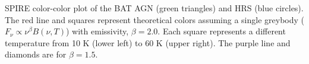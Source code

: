 \label{fig:color-color} SPIRE color-color plot of the BAT AGN (green triangles) and HRS (blue circles). The red line and squares represent theoretical colors assuming a single greybody ($F_{\nu} \propto \nu^{\beta}B(\nu, T)$) with emissivity, $\beta=2.0$. Each square represents a different temperature from 10 K (lower left) to 60 K (upper right). The purple line and diamonds are for $\beta=1.5$.